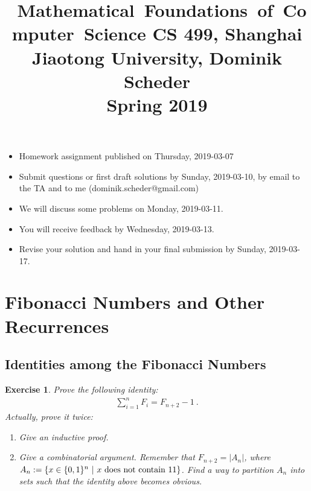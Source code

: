 \documentclass[12pt,a4]{article}
\date{}
\title{
\hbox{  Mathematical Foundations of Computer Science}
  \vspace{3mm}
{\normalsize CS 499,  Shanghai Jiaotong University,  Dominik Scheder\\
Spring 2019}
}
\newtheorem{exercise}[theorem]{Exercise}
\begin{document}
\maketitle


\setcounter{section}{1}

\begin{itemize}
 \item Homework assignment published on Thursday, 2019-03-07
 \item Submit questions or first draft solutions by Sunday, 2019-03-10,  by
 email to the TA and to me (dominik.scheder@gmail.com)
 \item We will discuss some problems on Monday, 2019-03-11.
 \item You will receive feedback by Wednesday, 2019-03-13.
 \item Revise your solution and hand in your final submission by Sunday, 2019-03-17.
\end{itemize}


\section{Fibonacci Numbers and Other Recurrences}

\subsection{Identities among the Fibonacci Numbers}


\begin{exercise}
    Prove the following identity:
    \begin{align*}
    \sum_{i=1}^{n} F_i = F_{n+2} - 1 \ .
    \end{align*}
    Actually, prove it twice:
    \begin{enumerate}
    \item Give an inductive proof.
    \item Give a {\em combinatorial} argument. Remember that $F_{n+2} = |A_n|$, where
    $A_n := \{ x \in \{0,1\}^n \ | \ x \textnormal{ does not contain 11} \}$. Find a way to partition
    $A_n$ into sets such that the identity above becomes obvious.
    \end{enumerate}
\end{exercise}
\end{document}
